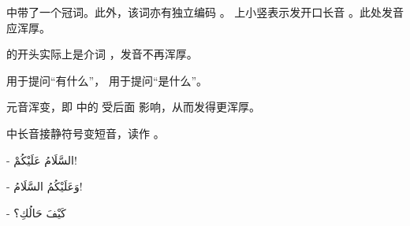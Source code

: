 \begin{note}
     中带了一个冠词。此外，该词亦有独立编码  。  上小竖表示发开口长音  。此处发音应浑厚。 
    
     的开头实际上是介词  ，发音不再浑厚。

     用于提问``有什么''， 用于提问``是什么''。 

    元音浑变，即  中的  受后面  影响，从而发得更浑厚。

     中长音接静符号变短音，读作  。
\end{note}

\begin{Arabic}
    - السَّلَامُ عَلَيْكُمْ!

    - وَعَلَيْكُمُ السَّلَامُ!

    - كَيْفَ حَالُكِ؟


\end{Arabic}
